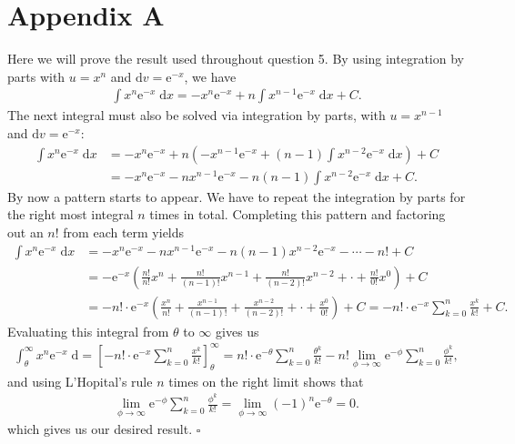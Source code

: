 \documentclass[10pt]{article}
\begin{document}
\section{Appendix A} \noindent
Here we will prove the result used throughout question 5. By using integration by parts with \(u = x^n\) and \(\mathrm{d}v = \mathrm{e}^{-x}\), we have 
\begin{align*}
    \int x^n \mathrm{e}^{-x} \;\mathrm{d}x = -x^n \mathrm{e}^{-x} + n \int x^{n-1} \mathrm{e}^{-x} \;\mathrm{d}x + C.
\end{align*}
The next integral must also be solved via integration by parts, with \(u = x^{n-1}\) and \(\mathrm{d}v = \mathrm{e}^{-x}\):
\begin{align*}
    \int x^n \mathrm{e}^{-x} \;\mathrm{d}x &= -x^n \mathrm{e}^{-x} + n \left( -x^{n-1} \mathrm{e}^{-x} + (n-1) \int x^{n-2} \mathrm{e}^{-x} \;\mathrm{d}x  \right) + C \\
    &= -x^n \mathrm{e}^{-x} -nx^{n-1} \mathrm{e}^{-x} - n(n-1) \int x^{n-2} \mathrm{e}^{-x} \;\mathrm{d}x + C.
\end{align*}
By now a pattern starts to appear. We have to repeat the integration by parts for the right most integral \(n\) times in total. 
Completing this pattern and factoring out an \(n!\) from each term yields
\begin{align*}
    \int x^n \mathrm{e}^{-x} \;\mathrm{d}x &= -x^n \mathrm{e}^{-x} - nx^{n-1}\mathrm{e}^{-x} - n(n-1)x^{n-2}\mathrm{e}^{-x} - \cdots - n! + C\\
    &= -\mathrm{e}^{-x} \left( \frac{n!}{n!}x^{n} + \frac{n!}{(n-1)!}x^{n-1} + \frac{n!}{(n-2)!}x^{n-2} + \cdot + \frac{n!}{0!}x^0 \right) + C\\
    &= -n! \cdot \mathrm{e}^{-x} \left( \frac{x^n}{n!} + \frac{x^{n-1}}{(n-1)!} + \frac{x^{n-2}}{(n-2)!} + \cdot + \frac{x^0}{0!} \right) + C
    = -n! \cdot \mathrm{e}^{-x} \sum_{k=0}^n \frac{x^k}{k!} + C.
\end{align*}
Evaluating this integral from \(\theta\) to \(\infty\) gives us 
\begin{align*}
    \int_{\theta}^{\infty} x^n \mathrm{e}^{-x} \;\mathrm{d} 
    = \left[ -n! \cdot \mathrm{e}^{-x} \sum_{k=0}^n \frac{x^k}{k!} \right]_{\theta}^{\infty}
    = n! \cdot \mathrm{e}^{-\theta} \sum_{k=0}^n \frac{\theta^k}{k!} - n! \lim_{\phi \to \infty} \mathrm{e}^{-\phi} \sum_{k=0}^n \frac{\phi^k}{k!},
\end{align*}
and using L'Hopital's rule \(n\) times on the right limit shows that 
\begin{align*}
    \lim_{\phi \to \infty} \mathrm{e}^{-\phi} \sum_{k=0}^n \frac{\phi^k}{k!} = \lim_{\phi \to \infty} (-1)^n \mathrm{e}^{-\theta} = 0.
\end{align*}
which gives us our desired result. \hfill \(\square\)
\end{document}
